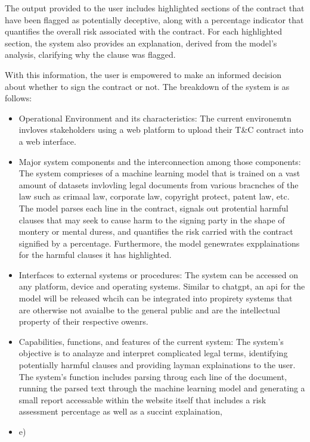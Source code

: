 The output provided to the user includes highlighted sections of the contract that have been flagged as potentially deceptive, along with a percentage indicator that quantifies the overall risk associated with the contract. For each highlighted section, the system also provides an explanation, derived from the model's analysis, clarifying why the clause was flagged.

With this information, the user is empowered to make an informed decision about whether to sign the contract or not. 
The breakdown of the system is as follows: 
\begin{itemize}
    \item Operational Environment and its characteristics: The current environemtn invloves stakeholders using a web platform to upload their T\&C contract into a web interface. 
    \item Major system components and the interconnection among those components: The system comprieses of a machine learning model that is trained on a vast amount of datasets invlovling legal documents from various bracnches of the law such as crimaal law, corporate law, copyright protect, patent law, etc. The model parses each line in the contract, signals out protential harmful clauses that may seek to cause harm to the signing party in the shape of montery or mental duress, and quantifies the risk carried with the contract signified by a percentage. Furthermore, the model genewrates expplainations for the harmful clauses it has highlighted. 
    \item Interfaces to external systems or procedures: The system can be accessed on any platform, device and operating systems. Similar to chatgpt, an api for the model will be released whcih can be integrated into propirety systems that are otherwise not avaialbe to the general public and are the intellectual property of their respective owenrs. 
    \item Capabilities, functions, and features of the current system: The system's objective is to analayze and interpret complicated legal terms, identifying potentially harmful clauses and providing layman explainations to the user. The system's function includes parsing throug each line of the document, running the parsed text through the machine learning model and generating a small report accessable within the website itself that includes a risk assessment percentage as well as a succint explaination, 
    \item e)                \begin{figure}[H]

\end{figure}
\end{itemize}

